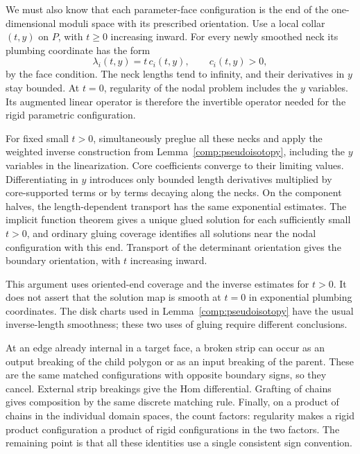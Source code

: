 We must also know that each parameter-face configuration is the
end of the one-dimensional moduli space with its prescribed
orientation.  Use a local collar $(t,y)$ on $P$, with $t\geq0$
increasing inward.  For every newly smoothed neck its plumbing
coordinate has the form
\begin{equation}
 \lambda_i(t,y)=t\,c_i(t,y),\qquad c_i(t,y)>0,
 \label{comp:simultaneous-plumbing}
\end{equation}
by the face condition.  The neck lengths tend to infinity, and
their derivatives in $y$ stay bounded.  At $t=0$, regularity of
the nodal problem includes the $y$ variables.  Its augmented
linear operator is therefore the invertible operator needed for
the rigid parametric configuration.

For fixed small $t>0$, simultaneously preglue all these necks and
apply the weighted inverse construction from
Lemma~\ref{comp:pseudoisotopy}, including the $y$ variables in the
linearization.  Core coefficients converge to their limiting
values.  Differentiating in $y$ introduces only bounded
length derivatives multiplied by core-supported terms or by
terms decaying along the necks.  On the component halves, the
length-dependent transport has the same exponential estimates.
The implicit function theorem gives a unique glued solution for
each sufficiently small $t>0$, and ordinary gluing coverage
identifies all solutions near the nodal configuration with this
end.  Transport of the determinant orientation gives the boundary
orientation, with $t$ increasing inward.

This argument uses oriented-end coverage and the inverse estimates
for $t>0$.  It does not assert that the solution map is smooth at
$t=0$ in exponential plumbing coordinates.  The disk charts used
in Lemma~\ref{comp:pseudoisotopy} have the usual inverse-length
smoothness; these two uses of gluing require different conclusions.

At an edge already internal in a target face, a broken strip can
occur as an output breaking of the child polygon or as an input
breaking of the parent.  These are the same matched
configurations with opposite boundary signs, so they cancel.
External strip breakings give the Hom differential.  Grafting of
chains gives composition by the same discrete matching rule.
Finally, on a product of chains in the individual domain spaces,
the count factors: regularity makes a rigid product configuration
a product of rigid configurations in the two factors.  The
remaining point is that all these identities use a single
consistent sign convention.

